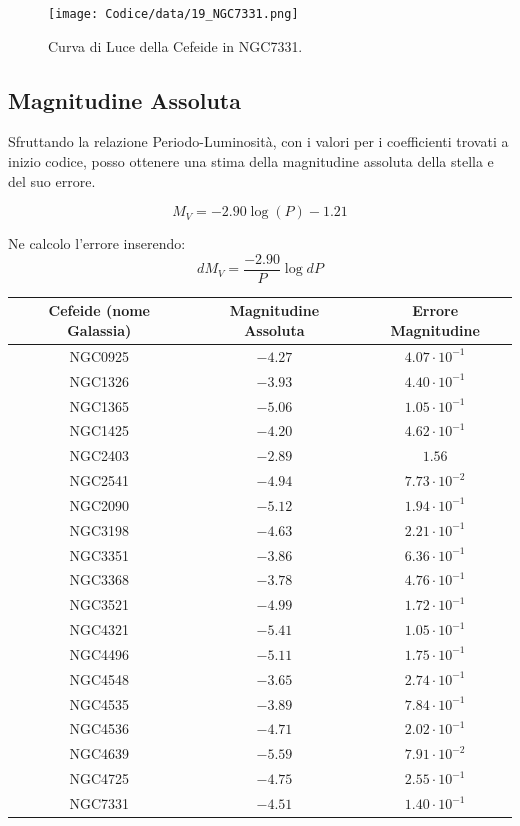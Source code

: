 \documentclass{article}
\newcommand{\e}[1]{\cdot 10^{#1}} %
\begin{document}
\begin{figure}[H]
  \centering
  \texttt{[image: Codice/data/19\_NGC7331.png]}
  \caption{Curva di Luce della Cefeide in NGC7331.}
\end{figure}

\subsection{Magnitudine Assoluta}

Sfruttando la relazione Periodo-Luminosità, con i valori per i
coefficienti trovati a inizio codice, posso ottenere una stima della
magnitudine assoluta della stella e del suo errore.

\begin{equation}
  M_V = -2.90 \log (P) -1.21
\end{equation}

Ne calcolo l'errore inserendo:
\begin{equation}
  dM_V = \frac{-2.90}{P} \log{dP}
 \end{equation}

\begin{center}
  \begin{tabular}{ccc}
  \toprule
  Cefeide (nome Galassia) & Magnitudine Assoluta & Errore Magnitudine\\
  \midrule
    NGC0925 & $-4.27$ & $4.07\e{-1}$ \\
    NGC1326 & $-3.93$ & $4.40\e{-1}$ \\
    NGC1365 & $-5.06$ & $1.05\e{-1}$ \\
    NGC1425 & $-4.20$ & $4.62\e{-1}$ \\
    NGC2403 & $-2.89$ & $1.56$ \\
    NGC2541 & $-4.94$ & $7.73\e{-2}$ \\
    NGC2090 & $-5.12$ & $1.94\e{-1}$ \\
    NGC3198 & $-4.63$ & $2.21\e{-1}$ \\
    NGC3351 & $-3.86$ & $6.36\e{-1}$ \\
    NGC3368 & $-3.78$ & $4.76\e{-1}$ \\
    NGC3521 & $-4.99$ & $1.72\e{-1}$ \\
    NGC4321 & $-5.41$ & $1.05\e{-1}$ \\
    NGC4496 & $-5.11$ & $1.75\e{-1}$ \\
    NGC4548 & $-3.65$ & $2.74\e{-1}$ \\
    NGC4535 & $-3.89$ & $7.84\e{-1}$ \\
    NGC4536 & $-4.71$ & $2.02\e{-1}$ \\
    NGC4639 & $-5.59$ & $7.91\e{-2}$ \\
    NGC4725 & $-4.75$ & $2.55\e{-1}$ \\
    NGC7331 & $-4.51$ & $1.40\e{-1}$ \\
  \bottomrule
 \end{tabular}
\end{center}
\end{document}
